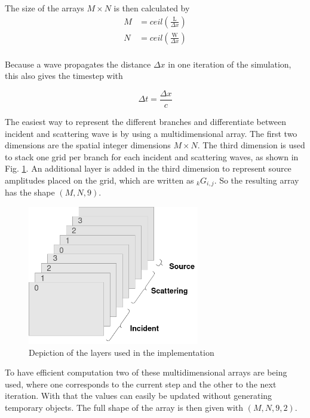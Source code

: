 \documentclass[twocolumn]{article}
\begin{document}
The size of the arrays $M\times N$ is then calculated by
\begin{equation}
\begin{aligned}
    M &= ceil\left(\frac{\text{L}}{\Delta x}\right) \\
    N &= ceil\left(\frac{\text{W}}{\Delta x}\right) \\
\end{aligned}
\label{eq_integer_dimension}
\end{equation}

Because a wave propagates the distance $\Delta x$ in one iteration of the simulation,
this also gives the timestep with

\begin{equation}
    \Delta t = \frac{\Delta x}{c}
    \label{eq_delta_t}
\end{equation}

The easiest way to represent the different branches and differentiate between incident
and scattering wave is by using a multidimensional array.
The first two dimensions are the spatial integer dimensions $M\times N$.
The third dimension is used to stack one grid per branch for each incident and scattering
waves, as shown in Fig. \ref{fig_python_layers}.
An additional layer is added in the third dimension to represent source amplitudes placed
on the grid, which are written as $_{k}G_{i,j}$.
So the resulting array has the shape $\left(M, N, 9\right)$.

\begin{figure}[H]
    \centering
    \includegraphics[width=75mm]{./Images/python_layers_bw.png}
    \caption{Depiction of the layers used in the implementation}
    \label{fig_python_layers}
\end{figure}

To have efficient computation two of these multidimensional arrays are being used,
where one corresponds to the current step and the other to the next iteration.
With that the values can easily be updated without generating temporary objects.
The full shape of the array is then given with $\left(M, N, 9, 2\right)$.
\end{document}
